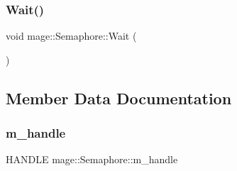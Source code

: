 \subsubsection{\texorpdfstring{Wait()}{Wait()}}
{\footnotesize\ttfamily void mage\+::\+Semaphore\+::\+Wait (\begin{DoxyParamCaption}{ }\end{DoxyParamCaption})}



\subsection{Member Data Documentation}
\hypertarget{classmage_1_1_semaphore_ac1ded856984b4ac3739d9ff627838fda}{}\label{classmage_1_1_semaphore_ac1ded856984b4ac3739d9ff627838fda} 
\subsubsection{\texorpdfstring{m\+\_\+handle}{m\_handle}}
{\footnotesize\ttfamily H\+A\+N\+D\+LE mage\+::\+Semaphore\+::m\+\_\+handle\hspace{0.3cm}{\ttfamily [private]}}


